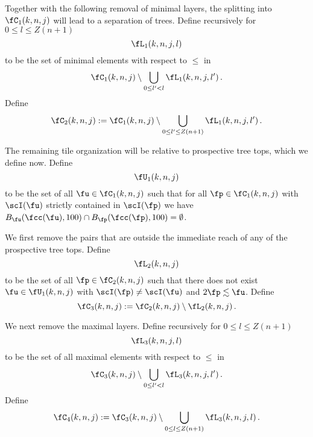Together with the following removal of minimal layers, the splitting into $\fC_1(k,n,j)$ will lead to a separation of trees.
Define recursively for $0\le l\le Z(n+1)$
\begin{equation}
    \label{eq-L1-def}
    \fL_1(k,n,j,l)
\end{equation}
to be the set of minimal elements with respect to $\le$ in
\begin{equation}
    \fC_1(k,n,j)\setminus \bigcup_{0\le l'<l}
\fL_1(k,n,j,l')\, .
\end{equation}
Define
\begin{equation}
    \label{eq-C2-def}
    \fC_2(k,n,j):= \fC_1(k,n,j)\setminus \bigcup_{0\le l'\le Z(n+1)}
\fL_1(k,n,j,l')\, .
\end{equation}

The remaining tile organization will be relative to
prospective tree tops, which we define now.
Define
\begin{equation}\label{defunkj}
     \fU_1(k,n,j)
\end{equation}
to be the set of all
$\fu \in \fC_1(k,n,j)$ such that
for all $\fp \in \fC_1(k,n,j)$
with $\scI(\fu)$ strictly contained in
$\scI(\fp)$ we have $B_{\fu}(\fcc(\fu), 100) \cap B_{\fp}(\fcc(\fp),100) = \emptyset$.

We first remove the pairs that are outside the immediate reach of any of the prospective tree tops.
Define
\begin{equation}
\label{eq-L2-def}
\fL_2(k,n,j)
\end{equation}
to be the set of all $\fp\in \fC_2(k,n,j)$ such that there
does not exist
$\fu\in \fU_1(k,n,j)$
with $\scI(\fp)\neq \scI(\fu)$ and $2\fp\lesssim \fu$.
Define
\begin{equation}
\label{eq-C3-def}
\fC_3(k,n,j):=\fC_2(k,n,j)
  \setminus \fL_2(k,n,j)\, .
\end{equation}


We next remove the maximal layers.
Define recursively for $0 \le l \le Z(n+1)$
\begin{equation}
    \label{eq-L3-def}
    \fL_3(k,n,j,l)
\end{equation}
to be the set of all maximal elements with respect to $\le$ in
\begin{equation}
    \fC_3(k,n,j) \setminus \bigcup_{0 \le l' < l} \fL_3(k,n,j,l')\,.
\end{equation}
Define
\begin{equation}
\label{eq-C4-def}
\fC_4(k,n,j):=\fC_3(k,n,j)
  \setminus \bigcup_{0 \le l \le Z(n+1)} \fL_3(k,n,j,l)\,.
\end{equation}

